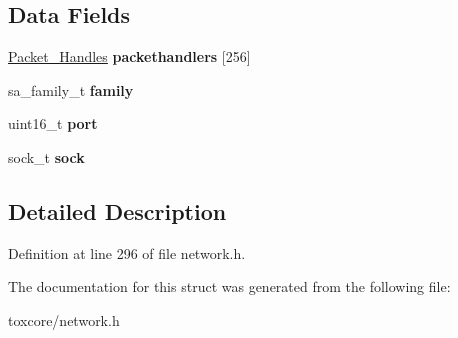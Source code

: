 \subsection*{Data Fields}
\begin{DoxyCompactItemize}
\item 
\hypertarget{struct_networking___core_acf65b41b1fc6f52a40016a2329a8ba30}{\hyperlink{struct_packet___handles}{Packet\+\_\+\+Handles} {\bfseries packethandlers} \mbox{[}256\mbox{]}}\label{struct_networking___core_acf65b41b1fc6f52a40016a2329a8ba30}

\item 
\hypertarget{struct_networking___core_a59fa33606a579e9080aced9a5d2659de}{sa\+\_\+family\+\_\+t {\bfseries family}}\label{struct_networking___core_a59fa33606a579e9080aced9a5d2659de}

\item 
\hypertarget{struct_networking___core_a8e0798404bf2cf5dabb84c5ba9a4f236}{uint16\+\_\+t {\bfseries port}}\label{struct_networking___core_a8e0798404bf2cf5dabb84c5ba9a4f236}

\item 
\hypertarget{struct_networking___core_a35b19d84fb632ca8ce5cab237f7089a5}{sock\+\_\+t {\bfseries sock}}\label{struct_networking___core_a35b19d84fb632ca8ce5cab237f7089a5}

\end{DoxyCompactItemize}


\subsection{Detailed Description}


Definition at line 296 of file network.\+h.



The documentation for this struct was generated from the following file\+:\begin{DoxyCompactItemize}
\item 
toxcore/network.\+h\end{DoxyCompactItemize}
